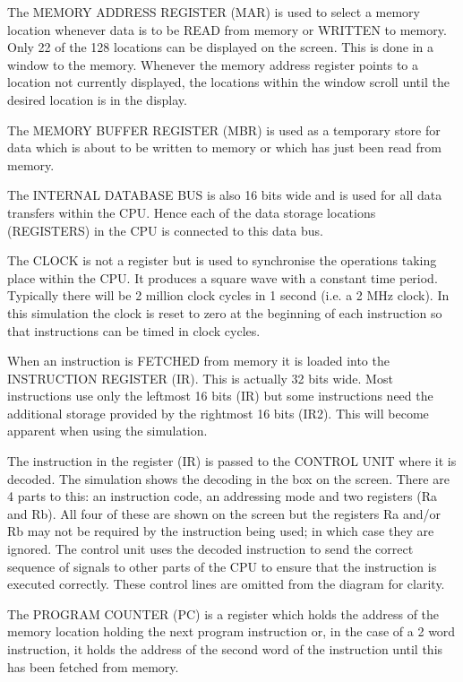 \documentclass{article}
\begin{document}
The MEMORY ADDRESS REGISTER (MAR) is used to select a memory location whenever data is to be READ from memory or WRITTEN to memory. Only 22 of the 128 locations can be displayed on the screen. This is done in a window to the memory. Whenever the memory address register points to a location not currently displayed, the locations within the window scroll until the desired location is in the display.

The MEMORY BUFFER REGISTER (MBR) is used as a temporary store for data which is about to be written to memory or which has just been read from memory.

The INTERNAL DATABASE BUS is also 16 bits wide and is used for all data transfers within the CPU. Hence each of the data storage locations (REGISTERS) in the CPU is connected to this data bus.

The CLOCK is not a register but is used to synchronise the operations taking place within the CPU. It produces a square wave with a constant time period. Typically there will be 2 million clock cycles in 1 second (i.e. a 2 MHz clock). In this simulation the clock is reset to zero at the beginning of each instruction so that instructions can be timed in clock cycles.

When an instruction is FETCHED from memory it is loaded into the INSTRUCTION REGISTER (IR). This is actually 32 bits wide. Most instructions use only the leftmost 16 bits (IR) but some instructions need the additional storage provided by the rightmost 16 bits (IR2). This will become apparent when using the simulation.

The instruction in the register (IR) is passed to the CONTROL UNIT where it is decoded. The simulation shows the decoding in the box on the screen. There are 4 parts to this: an instruction code, an addressing mode and two registers (Ra and Rb). All four of these are shown on the screen but the registers Ra and/or Rb may not be required by the instruction being used; in which case they are ignored. The control unit uses the decoded instruction to send the correct sequence of signals to other parts of the CPU to ensure that the instruction is executed correctly. These control lines are omitted from the diagram for clarity.

The PROGRAM COUNTER (PC) is a register which holds the address of the memory location holding the next program instruction or, in the case of a 2 word instruction, it holds the address of the second word of the instruction until this has been fetched from memory.
\end{document}
